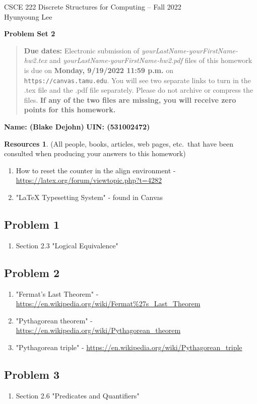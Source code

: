 \documentclass{article}
\theoremstyle{definition}
\newtheorem*{resources}{Resources}
\newcommand{\name}[2]{\noindent\textbf{Name: #1}\hfill \textbf{UIN: #2}
  \newcommand{\myName}{#1}
  \newcommand{\myUIN}{#2}
}
\newcommand{\problemset}[1]{\begin{center}\textbf{Problem Set #1}\end{center}}
\newcommand{\duedate}[1]{\begin{quote}\textbf{Due dates:} Electronic
    submission of \textsl{yourLastName-yourFirstName-hw2.tex} and 
    \textsl{yourLastName-yourFirstName-hw2.pdf} files of this homework is due on
    \textbf{#1} on \texttt{https://canvas.tamu.edu}. You will see two separate links
    to turn in the .tex file and the .pdf file separately. Please do not archive or compress the files.  
    \textbf{If any of the two files are missing, you will receive zero points for this homework.}\end{quote} }
\begin{document}
\begin{center}
{\large
CSCE 222 Discrete Structures for Computing -- Fall 2022\\[.5ex]
Hyunyoung Lee\\}
\end{center}
\problemset{2}
\duedate{Monday, 9/19/2022 11:59 p.m.}
\name{ (Blake Dejohn) }{ (531002472) }  %
\begin{resources} (All people, books, articles, web pages, etc.\ that
  have been consulted when producing your answers to this homework)
\hspace{1cm}
\begin{enumerate}
\subsection*{Resources Overall (used for the whole document)}
\item How to reset the counter in the align environment - \url{https://latex.org/forum/viewtopic.php?t=4282}
\item "LaTeX Typesetting System" - found in Canvas
\end{enumerate}
\subsection*{Problem 1}
\begin{enumerate}
\item Section 2.3 "Logical Equivalence"
\end{enumerate}
\subsection*{Problem 2}
\begin{enumerate}
\item "Fermat's Last Theorem" - \url{https://en.wikipedia.org/wiki/Fermat%27s_Last_Theorem}
\item "Pythagorean theorem" - \url{https://en.wikipedia.org/wiki/Pythagorean_theorem}
\item "Pythagorean triple" - \url{https://en.wikipedia.org/wiki/Pythagorean_triple}
\end{enumerate}
\subsection*{Problem 3}
\begin{enumerate}
\item Section 2.6 "Predicates and Quantifiers"
\end{enumerate}

\end{resources}
\end{document}
